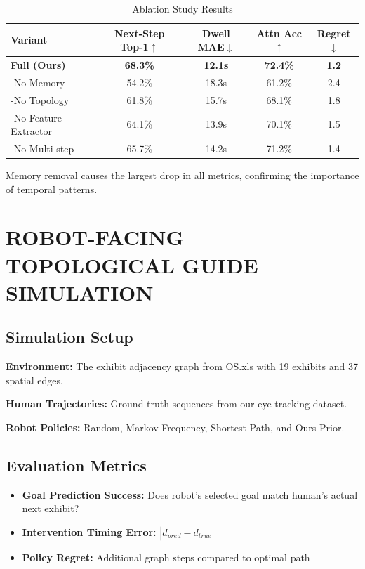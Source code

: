\documentclass{letterpaper,article}
\begin{document}
\begin{table}[h]
\centering
\caption{Ablation Study Results}
\begin{tabular}{lcccc}
\toprule
Variant & Next-Step Top-1$\uparrow$ & Dwell MAE$\downarrow$ & Attn Acc$\uparrow$ & Regret$\downarrow$ \\
\midrule
\textbf{Full (Ours)} & \textbf{68.3\%} & \textbf{12.1s} & \textbf{72.4\%} & \textbf{1.2} \\
-No Memory & 54.2\% & 18.3s & 61.2\% & 2.4 \\
-No Topology & 61.8\% & 15.7s & 68.1\% & 1.8 \\
-No Feature Extractor & 64.1\% & 13.9s & 70.1\% & 1.5 \\
-No Multi-step & 65.7\% & 14.2s & 71.2\% & 1.4 \\
\bottomrule
\end{tabular}
\label{tab:ablation}
\end{table}

Memory removal causes the largest drop in all metrics, confirming the importance of temporal patterns.

\section{ROBOT-FACING TOPOLOGICAL GUIDE SIMULATION}

\subsection{Simulation Setup}

\textbf{Environment:} The exhibit adjacency graph from OS.xls with 19 exhibits and 37 spatial edges.

\textbf{Human Trajectories:} Ground-truth sequences from our eye-tracking dataset.

\textbf{Robot Policies:} Random, Markov-Frequency, Shortest-Path, and Ours-Prior.

\subsection{Evaluation Metrics}

\begin{itemize}
    \item \textbf{Goal Prediction Success:} Does robot's selected goal match human's actual next exhibit?
    \item \textbf{Intervention Timing Error:} $|d_{pred} - d_{true}|$
    \item \textbf{Policy Regret:} Additional graph steps compared to optimal path
\end{itemize}
\end{document}
